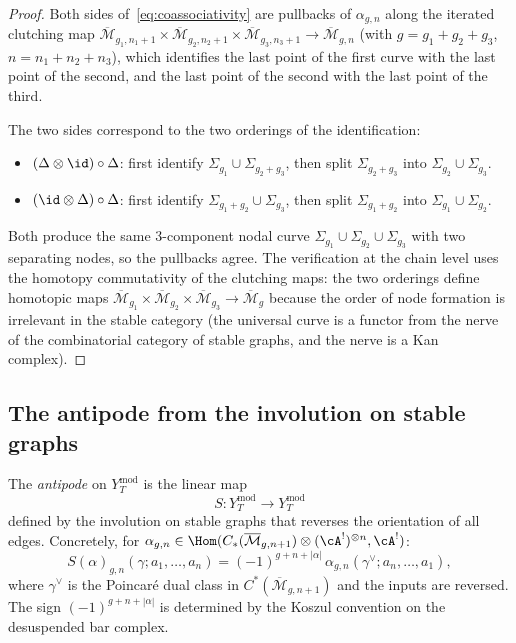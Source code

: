 \begin{proof}
Both sides of~\eqref{eq:coassociativity} are pullbacks of
$\alpha_{g, n}$ along the iterated clutching map
$\overline{\mathcal{M}}_{g_1, n_1+1} \times
\overline{\mathcal{M}}_{g_2, n_2+1} \times
\overline{\mathcal{M}}_{g_3, n_3+1}
\to \overline{\mathcal{M}}_{g, n}$
(with $g = g_1 + g_2 + g_3$, $n = n_1 + n_2 + n_3$), which
identifies the last point of the first curve with the last point
of the second, and the last point of the second with the last
point of the third.

The two sides correspond to the two orderings of the
identification:
\begin{itemize}
\item $(\Delta \otimes \id) \circ \Delta$: first identify
$\Sigma_{g_1} \cup \Sigma_{g_2+g_3}$, then split
$\Sigma_{g_2+g_3}$ into $\Sigma_{g_2} \cup \Sigma_{g_3}$.
\item $(\id \otimes \Delta) \circ \Delta$: first identify
$\Sigma_{g_1+g_2} \cup \Sigma_{g_3}$, then split
$\Sigma_{g_1+g_2}$ into $\Sigma_{g_1} \cup \Sigma_{g_2}$.
\end{itemize}
Both produce the same 3-component nodal curve
$\Sigma_{g_1} \cup \Sigma_{g_2} \cup \Sigma_{g_3}$ with two
separating nodes, so the pullbacks agree. The verification
at the chain level uses the homotopy commutativity of the
clutching maps: the two orderings define homotopic maps
$\overline{\mathcal{M}}_{g_1} \times \overline{\mathcal{M}}_{g_2}
\times \overline{\mathcal{M}}_{g_3} \to
\overline{\mathcal{M}}_g$ because the order of node formation
is irrelevant in the stable category (the universal curve is a
functor from the nerve of the combinatorial category of stable
graphs, and the nerve is a Kan complex).
\end{proof}

\subsection{The antipode from the involution on stable graphs}

\begin{definition}
The \emph{antipode} on $Y_T^{\mathrm{mod}}$ is the linear map
\begin{equation}
S \colon Y_T^{\mathrm{mod}}
\longrightarrow Y_T^{\mathrm{mod}}
\end{equation}
defined by the involution on stable graphs that reverses the
orientation of all edges. Concretely, for
$\alpha_{g,n} \in \Hom(C_\ast(\overline{\mathcal{M}}_{g,n+1})
\otimes (\cA^!)^{\otimes n}, \cA^!)$:
\[
S(\alpha)_{g,n}(\gamma; a_1, \ldots, a_n)
= (-1)^{g + n + |\alpha|}\,
\alpha_{g,n}(\gamma^\vee; a_n, \ldots, a_1),
\]
where $\gamma^\vee$ is the Poincar\'e dual class in
$C^\ast(\overline{\mathcal{M}}_{g,n+1})$ and the inputs are
reversed. The sign $(-1)^{g+n+|\alpha|}$ is determined by the
Koszul convention on the desuspended bar complex.
\end{definition}

